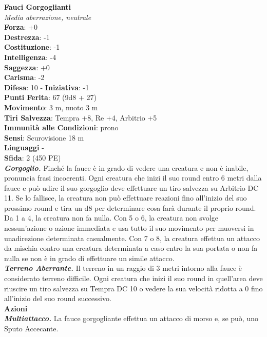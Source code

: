 \begin{multicols}{2}
\medskip\textbf{Fauci Gorgoglianti}\\
\emph{Media aberrazione, neutrale}\\
\textbf{Forza}: +0\\
\textbf{Destrezza}: -1\\
\textbf{Costituzione}: -1\\
\textbf{Intelligenza}: -4\\
\textbf{Saggezza}: +0\\
\textbf{Carisma}: -2\\
\textbf{Difesa}: 10 - \textbf{Iniziativa}: -1\\
\textbf{Punti Ferita}: 67 (9d8 + 27)\\
\textbf{Movimento}: 3 m, nuoto 3 m\\
\textbf{Tiri Salvezza}: Tempra +8, Re +4, Arbitrio +5\\
\textbf{Immunità alle Condizioni}: prono\\
\textbf{Sensi}: Scurovisione 18 m\\
\textbf{Linguaggi} -\\
\textbf{Sfida}: 2 (450 PE)\smallskip\\
\emph{\textbf{Gorgoglio.}} Finché la fauce è in grado di vedere una creatura e non è inabile, pronuncia frasi incoerenti. Ogni creatura che inizi il suo round entro 6 metri dalla fauce e può udire il suo gorgoglio deve effettuare un tiro salvezza su Arbitrio DC 11. Se lo fallisce, la creatura non può effettuare reazioni fino all'inizio del suo prossimo round e tira un d8 per determinare cosa farà durante il proprio round. Da 1 a 4, la creatura non fa nulla. Con 5 o 6, la creatura non svolge nessun'azione o azione immediata e usa tutto il suo movimento per muoversi in unadirezione determinata casualmente. Con 7 o  8, la creatura effettua un attacco da mischia contro una creatura determinata a caso entro la sua portata o non fa nulla se non è in grado di effettuare un simile attacco.\\
\emph{\textbf{Terreno Aberrante.}} Il terreno in un raggio di 3 metri intorno alla fauce è considerato terreno difficile. Ogni creatura che inizi il suo round in quell'area deve riuscire un tiro salvezza su Tempra DC 10 o vedere la sua velocità ridotta a 0 fino all'inizio del suo round successivo.\\
\smallskip\textbf{Azioni}\\
\emph{\textbf{Multiattacco.}} La fauce gorgogliante effettua un attacco di morso e, se può, uno Sputo Accecante.\\

\end{multicols}
